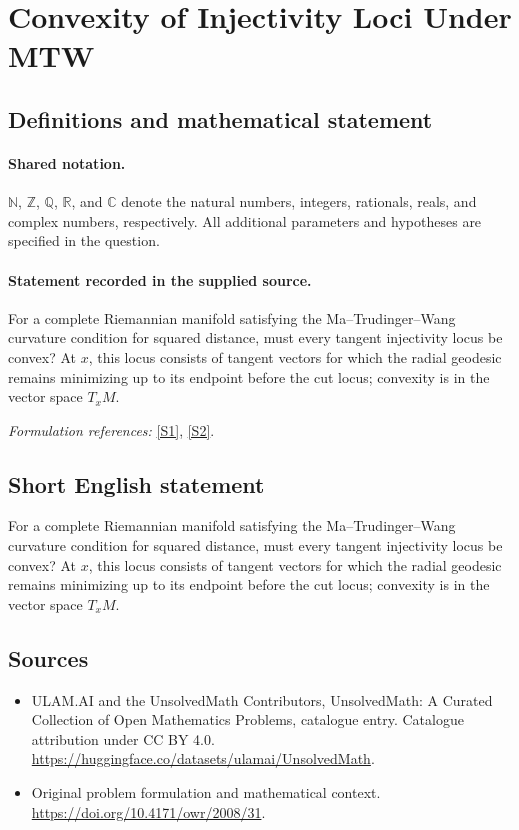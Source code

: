 \documentclass[11pt]{article}
\newcommand{\sref}[2]{\hyperlink{source:#1:#2}{[S#2]}}
\begin{document}
\section{Convexity of Injectivity Loci Under MTW}\label{statement}

\subsection{Definitions and mathematical statement}

\paragraph{Shared notation.}$\mathbb N$, $\mathbb Z$, $\mathbb Q$, $\mathbb R$, and $\mathbb C$ denote the natural numbers, integers, rationals, reals, and complex numbers, respectively. All additional parameters and hypotheses are specified in the question.


\paragraph{Statement recorded in the supplied source.}
For a complete Riemannian manifold satisfying the Ma--Trudinger--Wang curvature condition for squared distance, must every tangent injectivity locus be convex? At $x$, this locus consists of tangent vectors for which the radial geodesic remains minimizing up to its endpoint before the cut locus; convexity is in the vector space $T_xM$.
\par\smallskip\textit{Formulation references:} \sref{statement}{1}, \sref{statement}{2}.
\subsection{Short English statement}
For a complete Riemannian manifold satisfying the Ma--Trudinger--Wang curvature condition for squared distance, must every tangent injectivity locus be convex? At $x$, this locus consists of tangent vectors for which the radial geodesic remains minimizing up to its endpoint before the cut locus; convexity is in the vector space $T_xM$.
\subsection{Sources}
\begin{itemize}
\item[\hypertarget{source:statement:1}{S1}] ULAM.AI and the UnsolvedMath Contributors, UnsolvedMath: A Curated Collection of Open Mathematics Problems, catalogue entry. Catalogue attribution under CC BY 4.0.
\url{https://huggingface.co/datasets/ulamai/UnsolvedMath}.
\item[\hypertarget{source:statement:2}{S2}] Original problem formulation and mathematical context.
\url{https://doi.org/10.4171/owr/2008/31}.
\end{itemize}
\label{end:statement}
\end{document}
